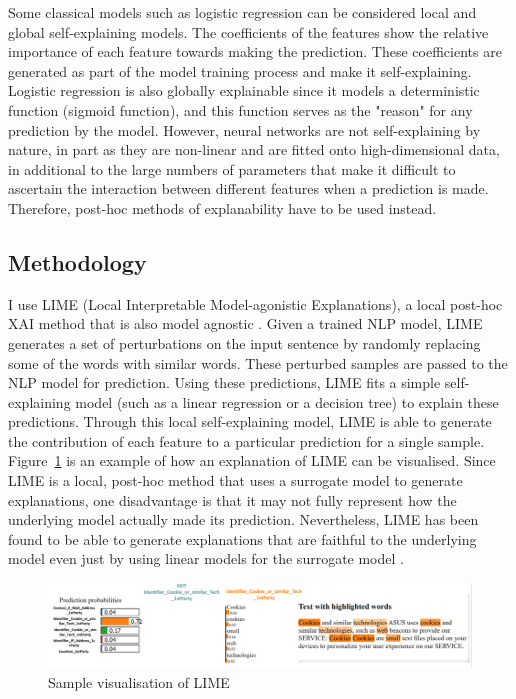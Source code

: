 Some classical models such as logistic regression can be considered local and global self-explaining models. The coefficients of the features show the relative importance of each feature towards making the prediction. These coefficients are generated as part of the model training process and make it self-explaining. Logistic regression is also globally explainable since it models a deterministic function (sigmoid function), and this function serves as the "reason" for any prediction by the model. However, neural networks are not self-explaining by nature, in part as they are non-linear and are fitted onto high-dimensional data, in additional to the large numbers of parameters that make it difficult to ascertain the interaction between different features when a prediction is made. Therefore, post-hoc methods of explanability have to be used instead. 

\subsection{Methodology}
I use LIME (Local Interpretable Model-agonistic Explanations), a local post-hoc XAI method that is also model agnostic \cite{lime}. Given a trained NLP model, LIME generates a set of perturbations on the input sentence by randomly replacing some of the words with similar words. These perturbed samples are passed to the NLP model for prediction. Using these predictions, LIME fits a simple self-explaining model (such as a linear regression or a decision tree) to explain these predictions. Through this local self-explaining model, LIME is able to generate the contribution of each feature to a particular prediction for a single sample. Figure~\ref{fig:lime_sample} is an example of how an explanation of LIME can be visualised. Since LIME is a local, post-hoc method that uses a surrogate model to generate explanations, one disadvantage is that it may not fully represent how the underlying model actually made its prediction. Nevertheless, LIME has been found to be able to generate explanations that are faithful to the underlying model even just by using linear models for the surrogate model \cite{lime}.

\begin{figure}[!ht]
	\centering
	\includegraphics[width=1\linewidth]{figures/explanations_visualisations/section_4a/Picture1.png}
	\caption{Sample visualisation of LIME}   
    \label{fig:lime_sample}
\end{figure}

